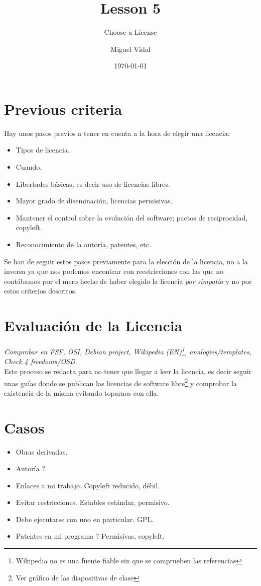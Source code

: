 \documentclass{scrartcl}
\title{\textbf{Lesson 5}}
\subtitle{Choose a License}
\author{Miguel Vidal}
\date{\today}
\begin{document}
\maketitle

\section{Previous criteria}

Hay unos pasos previos a tener en cuenta a la hora de elegir una licencia:
\begin{itemize}
    \item Tipos de licencia.
    \item Cuando.
    \item Libertades básicas, es decir uso de licencias libres.
    \item Mayor grado de diseminación, licencias permisivas.
    \item Mantener el control sobre la evolución del software; pactos de reciprocidad, copyleft.
    \item Reconocimiento de la autoría, patentes, etc.
\end{itemize}
Se han de seguir estos pasos previamente para la elección de la licencia, no a la inversa ya que nos podemos encontrar con reestricciones con las que no contábamos por el mero hecho de haber elegido la licencia \emph{por simpatía} y no por estos criterios descritos.

\section{Evaluación de la Licencia}
\emph{Comprobar en FSF, OSI, Debian project, Wikipedia (EN)\footnote{Wikipedia no es una fuente fiable sin que se comprueben las referencias}, analogies/templates, Check 4 freedoms/OSD}.\\

Este proceso se redacta para no tener que llegar a leer la licencia, es decir seguir unas guías donde se publican las licencias de software libre\footnote{Ver gráfico de las diapositivas de clase} y comprobar la existencia de la misma evitando toparnos con ella.

\section{Casos}

\begin{itemize}
    \item Obras derivadas.
    \item Autoría ? 
    \item Enlaces a mi trabajo. Copyleft reducido, débil.
    \item Evitar restricciones. Estables estándar, permisivo.
    \item Debe ejecutarse con uno en particular. GPL.
    \item Patentes en mi programa ? Permisivas, copyleft.
\end{itemize}
\end{document}
